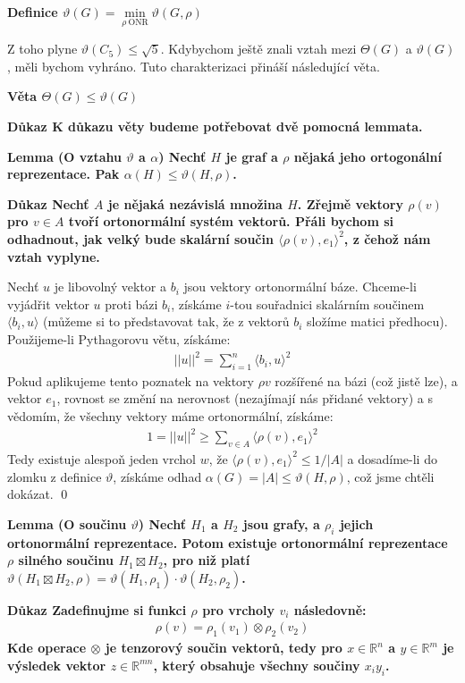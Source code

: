 \documentclass[a4paper,12pt,titlepage]{article}
\newcommand{\shn}{\Theta}
\newcommand{\lm}{\smallskip\noindent\bf Lemma\rm{} }
\newcommand{\dk}{\smallskip\noindent\bf Důkaz\rm{} }
\newcommand{\df}{\smallskip\noindent\bf Definice\rm{} }
\newcommand{\vt}{\smallskip\noindent\bf Věta\rm{} }
\newcommand{\R}{\mathbb{R}}
\newcommand{\sk}[1]{{\langle #1\rangle}}
\begin{document}
\df $\vartheta(G) = \min\limits_{\rho\ \text{ONR}} \vartheta(G,\rho)$

Z toho plyne $\vartheta(C_5)\le \sqrt 5$. Kdybychom ještě znali vztah mezi
$\shn(G)$ a $\vartheta(G)$, měli bychom vyhráno. Tuto charakterizaci přináší
následující věta.

\vt $\shn(G) \le \vartheta(G)$

\dk K důkazu věty budeme potřebovat dvě pomocná lemmata.


\lm (O vztahu $\vartheta$ a $\alpha$) Nechť $H$ je graf a $\rho$ nějaká jeho ortogonální reprezentace. Pak $\alpha(H) \leq \vartheta(H, \rho)$.

\dk Nechť $A$ je nějaká nezávislá množina $H$. Zřejmě vektory $\rho(v)$ pro $v \in A$ tvoří ortonormální systém vektorů. Přáli bychom si odhadnout, jak velký bude skalární součin $\sk{\rho(v),e_1}^2$, z čehož nám vztah vyplyne.

Nechť $u$ je libovolný vektor a $b_i$ jsou vektory ortonormální báze. Chceme-li vyjádřit vektor $u$ proti bázi $b_i$, získáme $i$-tou souřadnici skalárním součinem $\sk{b_i,u}$ (můžeme si to představovat tak, že z vektorů $b_i$ složíme matici předhocu). Použijeme-li Pythagorovu větu, získáme:
\begin{align}
	||u||^2 = \sum_{i=1}^n \sk{b_i,u}^2
\end{align}
Pokud aplikujeme tento poznatek na vektory $\rho{v}$ rozšířené na bázi (což jistě lze), a vektor $e_1$, rovnost se změní na nerovnost (nezajímají nás přidané vektory) a s vědomím, že všechny vektory máme ortonormální, získáme:
\begin{align}
	1=||u||^2 \geq \sum_{v\in A}\sk{\rho(v),e_1}^2
\end{align}
Tedy existuje alespoň jeden vrchol $w$, že $\sk{\rho(v),e_1}^2 \leq 1/|A|$ a dosadíme-li do zlomku z definice $\vartheta$, získáme odhad $ \alpha(G) = |A| \leq\vartheta(H,\rho)$, což jsme chtěli dokázat. \qed



\lm (O součinu $\vartheta$) Nechť $H_1$ a $H_2$ jsou grafy, a $\rho_i$ jejich 
ortonormální reprezentace. Potom existuje ortonormální reprezentace $\rho$ 
silného součinu $H_1 \boxtimes H_2$, pro niž platí $\vartheta(H_1 \boxtimes H_2, 
\rho) = \vartheta(H_1, \rho_1) \cdot \vartheta(H_2,\rho_2)$.

\dk Zadefinujme si funkci $\rho$ pro vrcholy $v_i$ následovně:
\begin{align}
	\rho(v) = \rho_1(v_1) \otimes \rho_2(v_2)
\end{align}
Kde operace $\otimes$ je tenzorový součin vektorů, tedy pro $x \in \R^n$ a $y 
\in \R^m$ je výsledek vektor $z \in \R^{mn}$, který obsahuje všechny součiny 
$x_iy_i$. 
\end{document}
